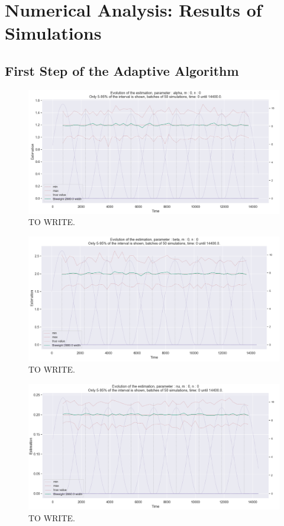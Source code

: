 \chapter{Numerical Analysis: Results of Simulations}


\section{First Step of the Adaptive Algorithm}
\begin{figure}
\centering
\includegraphics[width = 0.90 \textwidth]{../imag/chap3/0/Figure_2.png}
\caption{TO WRITE.}
\label{fig:first_estimate_0_alpha}
\end{figure}

\begin{figure}
\centering
\includegraphics[width = 0.90 \textwidth]{../imag/chap3/0/Figure_3.png}
\caption{TO WRITE.}
\label{fig:first_estimate_0_beta}
\end{figure}

\begin{figure}
\centering
\includegraphics[width = 0.90 \textwidth]{../imag/chap3/0/Figure_4.png}
\caption{TO WRITE.}
\label{fig:first_estimate_0_nu}
\end{figure}














